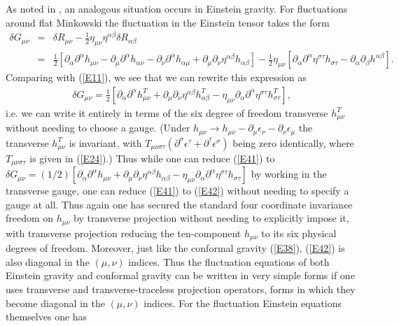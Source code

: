 \documentclass[aps]{revtex4}
\begin{document}
As noted in \cite{Mannheim2005}, an analogous situation occurs in Einstein gravity. For fluctuations around flat Minkowski the fluctuation in the Einstein tensor takes the form
%
\begin{eqnarray}
\delta G_{\mu\nu}&=&\delta R_{\mu\nu}-\frac{1}{2}\eta_{\mu\nu}\eta^{\alpha\beta}\delta R_{\alpha\beta}\nonumber\\
&=&
\frac{1}{2}\left[\partial_{\alpha}\partial^{\alpha}h_{\mu\nu}
-\partial_{\mu}\partial^{\alpha}h_{\alpha\nu}
-\partial_{\nu}\partial^{\alpha}h_{\alpha\mu}
+\partial_{\mu}\partial_{\nu}\eta^{\alpha\beta}h_{\alpha\beta}\right]
-\frac{1}{2}\eta_{\mu\nu}\left[\partial_{\alpha}\partial^{\alpha}\eta^{\sigma\tau}h_{\sigma\tau}-
\partial_{\alpha}\partial_{\beta}h^{\alpha\beta}\right].
\label{E41}
\end{eqnarray}
%
Comparing with (\ref{E11}), we see that we can rewrite this expression as 
%
\begin{eqnarray}
\delta G_{\mu\nu}=\frac{1}{2}\left[\partial_{\alpha}\partial^{\alpha}h^T_{\mu\nu}
+\partial_{\mu}\partial_{\nu}\eta^{\alpha\beta}h^T_{\alpha\beta}
-\eta_{\mu\nu}\partial_{\alpha}\partial^{\alpha}\eta^{\sigma\tau}h^T_{\sigma\tau}\right],
\label{E42}
\end{eqnarray}
%
i.e. we can write it entirely in terms of the six degree of freedom transverse $h^T_{\mu\nu}$ without needing to choose a gauge. (Under $h_{\mu\nu}\rightarrow h_{\mu\nu}-\partial_{\mu}\epsilon_{\nu}-\partial_{\nu}\epsilon_{\mu}$ the transverse $h^T_{\mu\nu}$ is invariant, with $T_{\mu\nu\sigma\tau}(\partial^{\sigma}\epsilon^{\tau}+\partial^{\tau}\epsilon^{\sigma})$ being zero identically, where $T_{\mu\nu\sigma\tau}$ is given in (\ref{E24}).) Thus while one can reduce (\ref{E41}) to $\delta G_{\mu\nu}=(1/2)[\partial_{\alpha}\partial^{\alpha}h_{\mu\nu}+\partial_{\mu}\partial_{\nu}\eta^{\alpha\beta}h_{\alpha\beta}-\eta_{\mu\nu}\partial_{\alpha}\partial^{\alpha}\eta^{\sigma\tau}h_{\sigma\tau}]$ by working in the transverse gauge, one can reduce (\ref{E41}) to (\ref{E42}) without needing to specify a gauge at all. Thus again one has secured the standard four coordinate invariance freedom on $h_{\mu\nu}$ by transverse projection without needing to explicitly impose it, with transverse projection reducing the ten-component $h_{\mu\nu}$ to its six physical degrees of freedom. Moreover, just like the conformal gravity (\ref{E38}), (\ref{E42}) is also diagonal in the $(\mu,\nu)$ indices. Thus the fluctuation equations of both Einstein gravity and conformal gravity  can be written in very simple forms if one uses transverse and transverse-traceless projection operators, forms in which they become diagonal in the  $(\mu,\nu)$ indices. For the fluctuation Einstein equations themselves one has 
\end{document}

